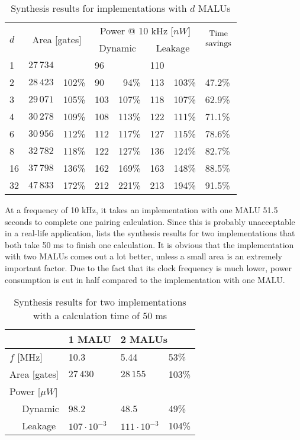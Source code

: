 \begin{table}[h]
	\caption{Synthesis results for implementations with $d$ MALUs}
	\label{table-mult-malu}
	\centering
	\begin{tabular}{llrlrlrl}
		\toprule
		\multirow{2}{*}{$d$} & \multicolumn{2}{c}{\multirow{2}{*}{Area [gates]}}	& \multicolumn{4}{c}{Power @ 10 kHz [$nW$]}	& \multirow{2}{*}{$\begin{array}{@{}c@{}}\text{Time}\\\text{savings}\end{array}$}\\
		\cmidrule{4-7}
		&	& & \multicolumn{2}{c}{Dynamic}	& \multicolumn{2}{c}{Leakage}	&\\
		\midrule
		1			& $27\,734$	& 			& 96	& 			& 110	& 			& \\
		2			& $28\,423$	& 102\%	& 90	& 94\%	& 113	& 103\%	& 47.2\%\\
		3			& $29\,071$	& 105\%	& 103	& 107\%	& 118	& 107\%	& 62.9\%\\
		4			& $30\,278$	& 109\%	& 108	& 113\%	& 122	& 111\%	& 71.1\%\\
		6			& $30\,956$	& 112\%	& 112	& 117\%	& 127	& 115\%	& 78.6\%\\
		8			& $32\,782$	& 118\%	& 122	& 127\%	& 136	& 124\%	& 82.7\%\\
		16			& $37\,798$	& 136\%	& 162	& 169\%	& 163	& 148\%	& 88.5\%\\
		32			& $47\,833$	& 172\%	& 212	& 221\%	& 213	& 194\%	& 91.5\%\\
		\hline		
	\end{tabular}
\end{table}

At a frequency of 10 kHz, it takes an implementation with one MALU 51.5 seconds to complete one pairing calculation. Since this is probably unacceptable in a real-life application,  lists the synthesis results for two implementations that both take 50 ms to finish one calculation. It is obvious that the implementation with two MALUs comes out a lot better, unless a small area is an extremely important factor. Due to the fact that its clock frequency is much lower, power consumption is cut in half compared to the implementation with one MALU.

\begin{table}[h]
	\caption{Synthesis results for two implementations with a calculation time of 50 ms}
	\label{table-speed-malu}

	\centering
	\begin{tabular}{lll@{$\;\;$}l}
		\toprule
		& 1 MALU	& \multicolumn{2}{l}{2 MALUs}\\
		\midrule
		$f$ [MHz]				& 10.3						& 5.44						& 53\% \\ 
		Area [gates]			& $27\,430$					& $28\,155$					& 103\% \\
		Power [$\mu W$]		& 								& 								& \\
		$\quad$ Dynamic		& 98.2						& 48.5						& 49\% \\
		$\quad$ Leakage		& $107 \cdot 10^{-3}$	& $111 \cdot 10^{-3}$	& 104\% \\
		\bottomrule	
	\end{tabular}
\end{table}

